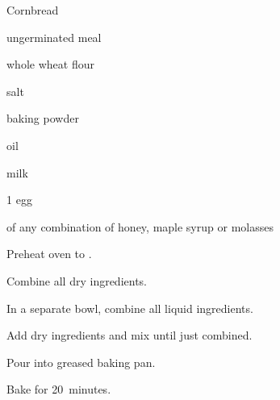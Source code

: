 \begin{recipe}{Cornbread}{}{}

\begin{ingredients}
\item {} ungerminated  meal
\item {} whole wheat flour
\item \tp{\half} salt
\item {} baking powder
\item {} oil
\item {} milk
\item 1 egg
\item {} of any combination of honey, maple syrup or molasses
\end{ingredients}

\begin{directions}
\item Preheat oven to .
\item Combine all dry ingredients.
\item In a separate bowl, combine all liquid ingredients.
\item Add dry ingredients and mix until just combined.
\item Pour into  greased baking pan.
\item Bake for 20~minutes.
\end{directions}
\end{recipe}
